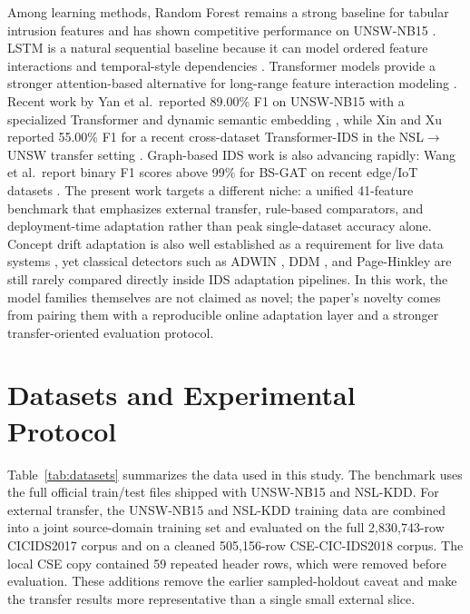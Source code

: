 \documentclass[conference]{IEEEtran}
\begin{document}
Among learning methods, Random Forest remains a strong baseline for tabular intrusion features and has shown competitive performance on UNSW-NB15 \cite{kasongo2020unsw}. LSTM is a natural sequential baseline because it can model ordered feature interactions and temporal-style dependencies \cite{hochreiter1997lstm}. Transformer models provide a stronger attention-based alternative for long-range feature interaction modeling \cite{vaswani2017attention}. Recent work by Yan et al.\ reported 89.00\% F1 on UNSW-NB15 with a specialized Transformer and dynamic semantic embedding \cite{yan2025transformer}, while Xin and Xu reported 55.00\% F1 for a recent cross-dataset Transformer-IDS in the NSL$\rightarrow$UNSW transfer setting \cite{xin2025crossdataset}. Graph-based IDS work is also advancing rapidly: Wang et al.\ report binary F1 scores above 99\% for BS-GAT on recent edge/IoT datasets \cite{wang2025bsgat}. The present work targets a different niche: a unified 41-feature benchmark that emphasizes external transfer, rule-based comparators, and deployment-time adaptation rather than peak single-dataset accuracy alone. Concept drift adaptation is also well established as a requirement for live data systems \cite{gama2014survey}, yet classical detectors such as ADWIN \cite{bifet2007adwin}, DDM \cite{gama2004ddm}, and Page-Hinkley \cite{page1954continuous} are still rarely compared directly inside IDS adaptation pipelines. In this work, the model families themselves are not claimed as novel; the paper's novelty comes from pairing them with a reproducible online adaptation layer and a stronger transfer-oriented evaluation protocol.

\section{Datasets and Experimental Protocol}
Table~\ref{tab:datasets} summarizes the data used in this study. The benchmark uses the full official train/test files shipped with UNSW-NB15 and NSL-KDD. For external transfer, the UNSW-NB15 and NSL-KDD training data are combined into a joint source-domain training set and evaluated on the full 2{,}830{,}743-row CICIDS2017 corpus and on a cleaned 505{,}156-row CSE-CIC-IDS2018 corpus. The local CSE copy contained 59 repeated header rows, which were removed before evaluation. These additions remove the earlier sampled-holdout caveat and make the transfer results more representative than a single small external slice.
\end{document}
